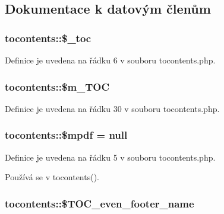 \subsection{Dokumentace k datovým členům}
\hypertarget{classtocontents_accb361b9a0daf782c595cef220109c53}{
\subsubsection[{\$\-\_\-toc}]{\setlength{\rightskip}{0pt plus 5cm}tocontents\-::\$\-\_\-toc}}\label{classtocontents_accb361b9a0daf782c595cef220109c53}


Definice je uvedena na řádku 6 v souboru tocontents.\-php.

\hypertarget{classtocontents_a016dbc2a43dee0673309c0c2225732a9}{
\subsubsection[{\$m\-\_\-\-T\-O\-C}]{\setlength{\rightskip}{0pt plus 5cm}tocontents\-::\$m\-\_\-\-T\-O\-C}}\label{classtocontents_a016dbc2a43dee0673309c0c2225732a9}


Definice je uvedena na řádku 30 v souboru tocontents.\-php.

\hypertarget{classtocontents_aabe78e68164daa6df85eb40e515c92bc}{
\subsubsection[{\$mpdf}]{\setlength{\rightskip}{0pt plus 5cm}tocontents\-::\$mpdf = null}}\label{classtocontents_aabe78e68164daa6df85eb40e515c92bc}


Definice je uvedena na řádku 5 v souboru tocontents.\-php.



Používá se v tocontents().

\hypertarget{classtocontents_a57590c49f1df1f31828a6096f831b188}{
\subsubsection[{\$\-T\-O\-C\-\_\-even\-\_\-footer\-\_\-name}]{\setlength{\rightskip}{0pt plus 5cm}tocontents\-::\$\-T\-O\-C\-\_\-even\-\_\-footer\-\_\-name}}\label{classtocontents_a57590c49f1df1f31828a6096f831b188}


